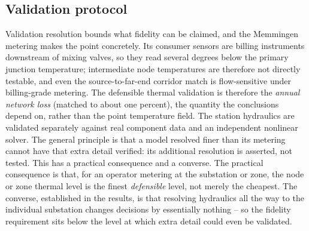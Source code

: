 \documentclass[a4paper,fleqn]{cas-dc}
\begin{document}
\subsection{Validation protocol}


Validation resolution bounds what fidelity can be claimed, and the Memmingen metering makes the
point concretely. Its consumer sensors are billing instruments downstream of mixing valves, so
they read several degrees below the primary junction temperature; intermediate node temperatures
are therefore not directly testable, and even the source-to-far-end corridor match is
flow-sensitive under billing-grade metering. The defensible thermal validation is therefore the
\emph{annual network loss} (matched to about one percent), the quantity the conclusions depend
on, rather than the point temperature field. The station hydraulics are validated separately against real component data and an
independent nonlinear solver. The general principle is that a model resolved finer than its
metering cannot have that extra detail verified: its additional resolution is asserted, not
tested. This has a practical
consequence and a converse. The practical consequence is that, for an operator metering at the
substation or zone, the node or zone thermal level is the finest \emph{defensible} level, not
merely the cheapest. The converse, established in the results, is that resolving hydraulics all
the way to the individual substation changes decisions by essentially nothing -- so the
fidelity requirement sits below the level at which extra detail could even be validated.
\end{document}

